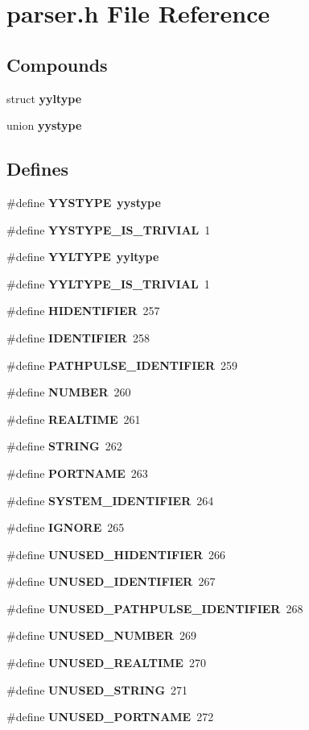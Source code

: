 \section{parser.h File Reference}
\label{parser_8h}
\subsection*{Compounds}
\begin{CompactItemize}
\item 
struct {\bf yyltype}
\item 
union {\bf yystype}
\end{CompactItemize}
\subsection*{Defines}
\begin{CompactItemize}
\item 
\#define {\bf YYSTYPE}\ {\bf yystype}
\item 
\#define {\bf YYSTYPE\_\-IS\_\-TRIVIAL}\ 1
\item 
\#define {\bf YYLTYPE}\ {\bf yyltype}
\item 
\#define {\bf YYLTYPE\_\-IS\_\-TRIVIAL}\ 1
\item 
\#define {\bf HIDENTIFIER}\ 257
\item 
\#define {\bf IDENTIFIER}\ 258
\item 
\#define {\bf PATHPULSE\_\-IDENTIFIER}\ 259
\item 
\#define {\bf NUMBER}\ 260
\item 
\#define {\bf REALTIME}\ 261
\item 
\#define {\bf STRING}\ 262
\item 
\#define {\bf PORTNAME}\ 263
\item 
\#define {\bf SYSTEM\_\-IDENTIFIER}\ 264
\item 
\#define {\bf IGNORE}\ 265
\item 
\#define {\bf UNUSED\_\-HIDENTIFIER}\ 266
\item 
\#define {\bf UNUSED\_\-IDENTIFIER}\ 267
\item 
\#define {\bf UNUSED\_\-PATHPULSE\_\-IDENTIFIER}\ 268
\item 
\#define {\bf UNUSED\_\-NUMBER}\ 269
\item 
\#define {\bf UNUSED\_\-REALTIME}\ 270
\item 
\#define {\bf UNUSED\_\-STRING}\ 271
\item 
\#define {\bf UNUSED\_\-PORTNAME}\ 272

\end{CompactItemize}
